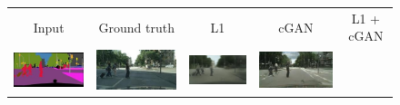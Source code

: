\begin{figure}[t]
\begin{center}
\bgroup 
 \def\arraystretch{0.2} 
 \setlength\tabcolsep{0.2pt}
\begin{tabular}{ccccc}
Input & Ground truth & L1 & cGAN & L1 + cGAN \\ 
\includegraphics[width=0.2\linewidth]{figs/cityscapes_loss_variations_latex/input_116.jpg} &
\includegraphics[width=0.2\linewidth]{figs/cityscapes_loss_variations_latex/gt_116.jpg} &
\includegraphics[width=0.2\linewidth]{figs/cityscapes_loss_variations_latex/L1_116.jpg} &
\includegraphics[width=0.2\linewidth]{figs/cityscapes_loss_variations_latex/cGAN_116.jpg} &

\end{tabular}
\end{center}
\end{figure}
